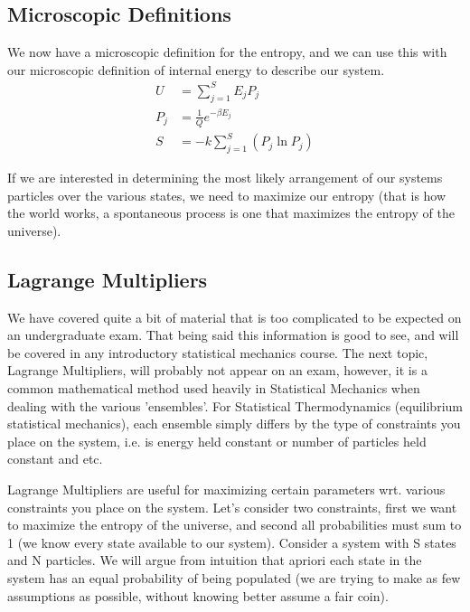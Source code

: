 \documentclass{article}
\begin{document}
\subsection*{Microscopic Definitions}
We now have a microscopic definition for the entropy, and we can use this with our microscopic definition of internal energy to describe our system. 
\begin{equation}
\begin{split}
    U &= \sum_{j=1}^SE_jP_j \\
    P_j &= \frac{1}{Q}e^{-\beta E_j} \\
    S &= -k\sum_{j=1}^S \left( P_j\ln P_j  \right) 
    \end{split}
\end{equation}

If we are interested in determining the most likely arrangement of our systems particles over the various states, we need to maximize our entropy (that is how the world works, a spontaneous process is one that maximizes the entropy of the universe).  

\subsection*{Lagrange Multipliers}
We have covered quite a bit of material that is too complicated to be expected on an undergraduate exam. 
That being said this information is good to see, and will be covered in any introductory statistical mechanics course.
The next topic, Lagrange Multipliers, will probably not appear on an exam, however, it is a common mathematical method used heavily in Statistical Mechanics when dealing with the various 'ensembles'.
For Statistical Thermodynamics (equilibrium statistical mechanics), each ensemble simply differs by the type of constraints you place on the system, i.e. is energy held constant or number of particles held constant and etc.  

Lagrange Multipliers are useful for maximizing certain parameters wrt. various constraints you place on the system.
Let's consider two constraints, first we want to maximize the entropy of the universe, and second all probabilities must sum to 1 (we know every state available to our system). 
Consider a system with S states and N particles. 
We will argue from intuition that apriori each state in the system has an equal probability of being populated (we are trying to make as few assumptions as possible, without knowing better assume a fair coin). 
\end{document}
